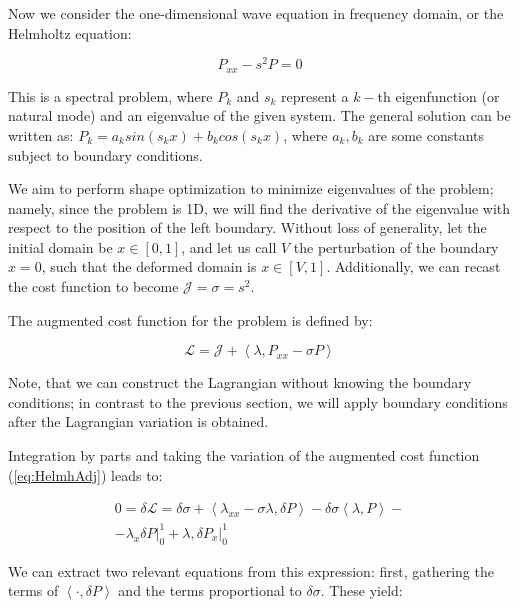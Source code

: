 Now we consider the one-dimensional wave equation in frequency domain, or the Helmholtz equation:

\begin{equation}
    P_{xx} - s^2 P = 0
\end{equation}

This is a spectral problem, where $P_k$ and $s_k$ represent a $k-$th eigenfunction (or natural mode) and an eigenvalue of the given system. The general solution can be written as: $P_k = a_k sin(s_k x) + b_k cos(s_k x)$, where $a_k, b_k$ are some constants subject to boundary conditions.

We aim to perform shape optimization to minimize eigenvalues of the problem; namely, since the problem is 1D, we will find the derivative of the eigenvalue with respect to the position of the left boundary. Without loss of generality, let the initial domain be $x \in [0,1]$, and let us call $V$ the perturbation of the boundary $x = 0$, such that the deformed domain is $x \in [V, 1]$. Additionally, we can recast the cost function to become $\mathcal{J} = \sigma = s^2$.

The augmented cost function for the problem is defined by:

\begin{equation}
\label{eq:HelmhAdj}
    \mathcal{L} = \mathcal{J} + \left<\lambda, P_{xx} - \sigma P \right>
\end{equation}

Note, that we can construct the Lagrangian without knowing the boundary conditions; in contrast to the previous section, we will apply boundary conditions after the Lagrangian variation is obtained.

Integration by parts and taking the variation of the augmented cost function (\ref{eq:HelmhAdj}) leads to:

\begin{subequations}
\begin{align}
    0 = \delta \mathcal{L} = \delta \sigma + \left<\lambda_{xx} - \sigma \lambda , \delta P \right> - \delta \sigma \left< \lambda, P \right> - \\
    - \lambda_x \delta P \rvert^1_0 +  \lambda, \delta P_x \rvert^1_0
\end{align}
\end{subequations}

We can extract two relevant equations from this expression: first, gathering the terms of $\left<\cdot , \delta P \right> $ and the terms proportional to $\delta \sigma$. These yield:

